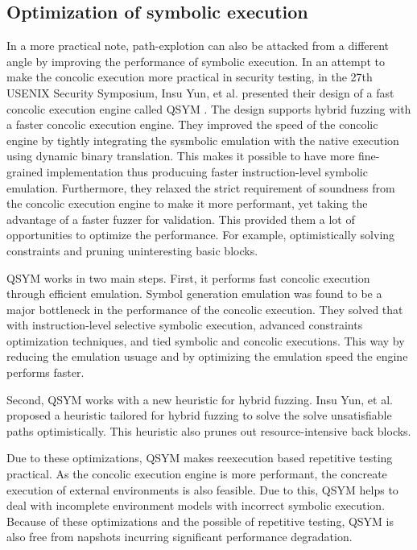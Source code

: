 \documentclass[	runningheads,
				a4paper]{llncs}
\begin{document}

\subsection{Optimization of symbolic execution}
In a more practical note, path-explotion can also be attacked from a different angle by improving the performance of symbolic execution. In an attempt to make the concolic execution more practical in security testing, in the 27th USENIX Security Symposium, Insu Yun, et al. presented their design of a fast concolic execution engine called QSYM \cite{yun2018qsym}. The design supports hybrid fuzzing with a faster concolic execution engine. They improved the speed of the concolic engine by tightly integrating the sysmbolic emulation with the native execution using dynamic binary translation. This makes it possible to have more fine-grained implementation thus producuing faster instruction-level symbolic emulation. Furthermore, they relaxed the strict requirement of soundness from the concolic execution engine to make it more performant, yet taking the advantage of a faster fuzzer for validation. This provided them a lot of opportunities to optimize the performance. For example, optimistically solving constraints and pruning uninteresting basic blocks.

QSYM \cite{yun2018qsym} works in two main steps. First, it performs fast concolic execution through efficient emulation. Symbol generation emulation was found to be a major bottleneck in the performance of the concolic execution. They solved that with instruction-level selective symbolic execution, advanced constraints optimization techniques, and tied symbolic and concolic executions. This way by reducing the emulation usuage and by optimizing the emulation speed the engine performs faster. 

Second, QSYM \cite{yun2018qsym} works with a new heuristic for hybrid fuzzing. Insu Yun, et al. proposed a heuristic tailored for hybrid fuzzing to solve the solve unsatisfiable paths optimistically. This heuristic also prunes out resource-intensive back blocks.

Due to these optimizations, QSYM makes reexecution based repetitive testing practical. As the concolic execution engine is more performant, the concreate execution of external environments is also feasible. Due to this, QSYM helps to deal with incomplete environment models with incorrect symbolic execution. Because of these optimizations and the possible of repetitive testing, QSYM is also free from napshots incurring significant performance degradation.
\end{document}

